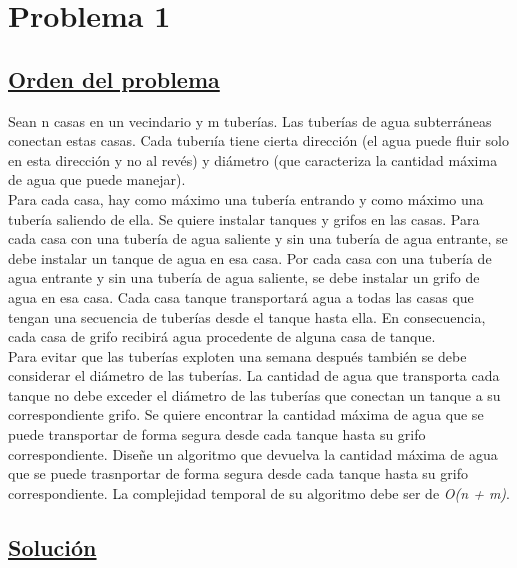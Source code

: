 \documentclass{article}
\begin{document}
    \newpage 

    \setcounter{tocdepth}{2}
    \tableofcontents

    \newpage 


    \section{Problema 1}
    
    \subsection{\underline{Orden del problema}} 

    Sean n casas en un vecindario y m tuber\'ias. Las tuber\'ias de agua subterr\'aneas conectan estas casas. Cada
    tuberı\'ia tiene cierta direcci\'on (el agua puede fluir solo en esta direcci\'on y no al rev\'es) y di\'ametro (que caracteriza
    la cantidad m\'axima de agua que puede manejar).
    \\[10pt]
    \noindent Para cada casa, hay como m\'aximo una tuber\'ia entrando y como m\'aximo una tuber\'ia saliendo de ella. Se quiere
    instalar tanques y grifos en las casas. Para cada casa con una tuber\'ia de agua saliente y sin una tuber\'ia de agua
    entrante, se debe instalar un tanque de agua en esa casa. Por cada casa con una tuber\'ia de agua entrante y
    sin una tuber\'ia de agua saliente, se debe instalar un grifo de agua en esa casa. Cada casa tanque transportar\'a
    agua a todas las casas que tengan una secuencia de tuber\'ias desde el tanque hasta ella. En consecuencia, cada
    casa de grifo recibir\'a agua procedente de alguna casa de tanque.
    \\[10pt]
    \noindent Para evitar que las tuber\'ias exploten una semana después tambi\'en se debe considerar el di\'ametro de las tuber\'ias.
    La cantidad de agua que transporta cada tanque no debe exceder el di\'ametro de las tuber\'ias que conectan un
    tanque a su correspondiente grifo. Se quiere encontrar la cantidad m\'axima de agua que se puede transportar de
    forma segura desde cada tanque hasta su grifo correspondiente. Dise\~ne un algoritmo que devuelva la cantidad
    m\'axima de agua que se puede trasnportar de forma segura desde cada tanque hasta su grifo correspondiente.
    La complejidad temporal de su algoritmo debe ser de \textit{O(n + m)}.
    
    \subsection{\underline{Soluci\'on}}
\end{document}
